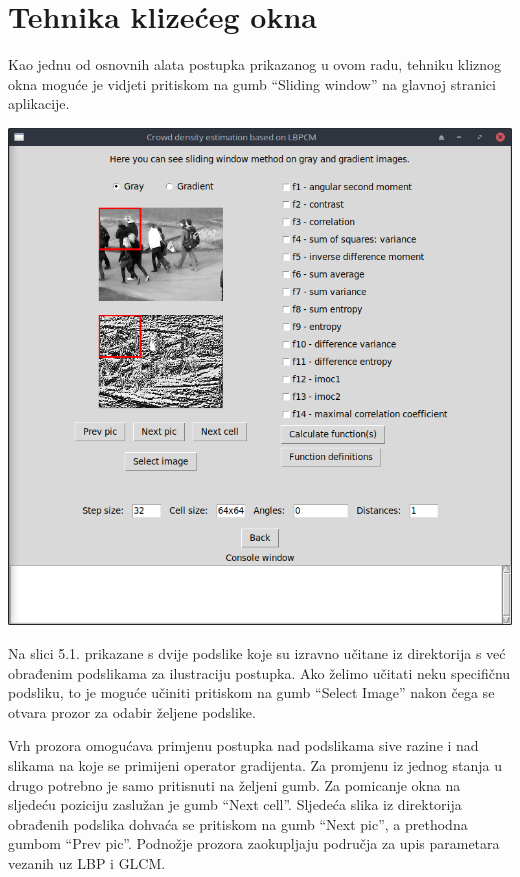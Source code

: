\documentclass[times, utf8, zavrsni]{fer}
\begin{document}
\chapter{Tehnika klizećeg okna}

Kao jednu od osnovnih alata postupka prikazanog u ovom radu, tehniku
kliznog okna moguće je vidjeti pritiskom na gumb \enquote{Sliding window}
na glavnoj stranici aplikacije. 

\bigbreak

\begin{minipage}{\linewidth}
\centering
\includegraphics[scale=0.4]{img/sw1.png}
\end{minipage}

\bigbreak

Na slici 5.1. prikazane s dvije podslike koje su izravno učitane iz direktorija
s već obrađenim podslikama za ilustraciju postupka. Ako želimo učitati neku
specifičnu podsliku, to je moguće učiniti pritiskom na gumb \enquote{Select Image}
nakon čega se otvara prozor za odabir željene podslike.

\bigbreak

Vrh prozora omogućava primjenu postupka nad podslikama sive razine i nad slikama
na koje se primijeni operator gradijenta. Za promjenu iz jednog stanja u
drugo potrebno je samo pritisnuti na željeni gumb. Za pomicanje okna na sljedeću
poziciju zaslužan je gumb \enquote{Next cell}. Sljedeća slika iz 
direktorija obrađenih podslika dohvaća se pritiskom na gumb \enquote{Next pic}, a 
prethodna gumbom \enquote{Prev pic}. Podnožje prozora zaokupljaju 
područja za upis parametara vezanih uz LBP i GLCM. 
\end{document}
